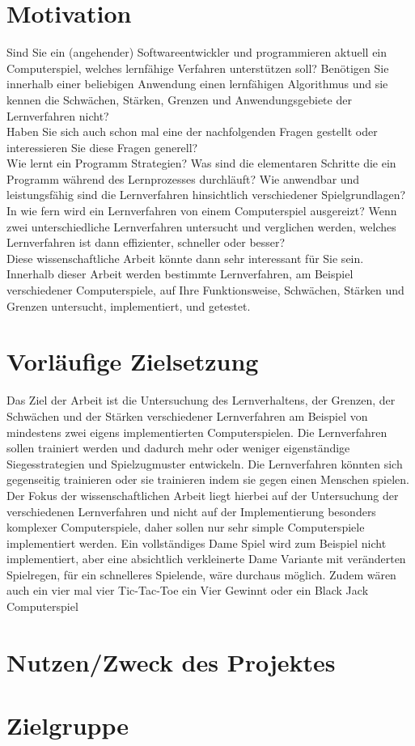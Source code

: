 \label{cha:projektvision}


\section*{Motivation}
Sind Sie ein (angehender) Softwareentwickler und programmieren aktuell ein Computerspiel, welches lernfähige Verfahren unterstützen soll? Benötigen Sie innerhalb einer beliebigen Anwendung einen lernfähigen Algorithmus und sie kennen die Schwächen, Stärken, Grenzen und Anwendungsgebiete der Lernverfahren nicht?\\

Haben Sie sich auch schon mal eine der nachfolgenden Fragen gestellt oder interessieren Sie diese Fragen generell?\\

Wie lernt ein Programm Strategien? Was sind die elementaren Schritte die ein Programm  während des Lernprozesses durchläuft? Wie anwendbar und leistungsfähig sind die Lernverfahren hinsichtlich verschiedener Spielgrundlagen? In wie fern wird ein Lernverfahren von einem Computerspiel ausgereizt? Wenn zwei unterschiedliche Lernverfahren untersucht und verglichen werden, welches Lernverfahren ist dann effizienter, schneller oder besser?\\

Diese wissenschaftliche Arbeit könnte dann sehr interessant für Sie sein. Innerhalb dieser Arbeit werden bestimmte Lernverfahren, am Beispiel verschiedener Computerspiele, auf Ihre Funktionsweise, Schwächen, Stärken und Grenzen untersucht, implementiert, und getestet. 

\section*{Vorläufige Zielsetzung}
Das Ziel der Arbeit ist die Untersuchung des Lernverhaltens, der Grenzen, der Schwächen und der Stärken verschiedener Lernverfahren am Beispiel von mindestens zwei eigens implementierten Computerspielen. Die Lernverfahren sollen trainiert werden und dadurch mehr oder weniger eigenständige Siegesstrategien und Spielzugmuster entwickeln. Die Lernverfahren könnten sich gegenseitig trainieren oder sie trainieren indem sie gegen einen Menschen spielen. Der Fokus der wissenschaftlichen Arbeit liegt hierbei auf der Untersuchung der verschiedenen Lernverfahren und nicht auf der Implementierung besonders komplexer Computerspiele, daher sollen nur sehr simple Computerspiele implementiert werden. Ein vollständiges Dame Spiel wird zum Beispiel nicht implementiert, aber eine absichtlich verkleinerte Dame Variante mit veränderten Spielregen, für ein schnelleres Spielende, wäre durchaus möglich. Zudem wären auch ein vier mal vier Tic-Tac-Toe ein Vier Gewinnt oder ein Black Jack Computerspiel

\section*{Nutzen/Zweck des Projektes}

\section*{Zielgruppe}